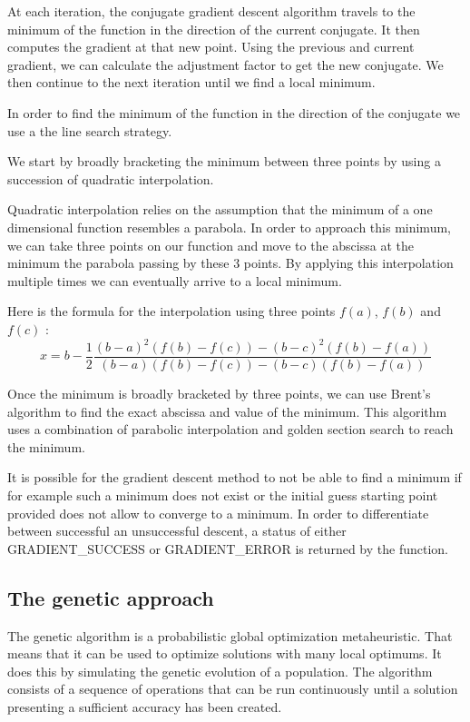\documentclass{book}
\begin{document}
At each iteration, the conjugate gradient descent algorithm travels to the minimum of the function in the direction of the current conjugate. It then computes the gradient at that new point. Using the previous and current gradient, we can calculate the adjustment factor to get the new conjugate. We then continue to the next iteration until we find a local minimum.

In order to find the minimum of the function in the direction of the conjugate we use a the line search strategy. 

We start by broadly bracketing the minimum between three points by using a succession of quadratic interpolation. 

Quadratic interpolation relies on the assumption that the minimum of a one dimensional function resembles a parabola. In order to approach this minimum, we can take three points on our function and move to the abscissa at the minimum the parabola passing by these 3 points. By applying this interpolation multiple times we can eventually arrive to a local minimum. 

Here is the formula for the interpolation using three points $f(a)$, $f(b)$ and $f(c)$ :
\begin{equation}
    x = b - \frac{1}{2} \frac{(b - a)^2(f(b) - f(c)) - (b - c)^2(f(b) - f(a))}{(b - a)(f(b) - f(c)) - (b - c)(f(b) - f(a))}
\end{equation}

Once the minimum is broadly bracketed by three points, we can use Brent's algorithm to find the exact abscissa and value of the minimum. This algorithm uses a combination of parabolic interpolation and golden section search to reach the minimum.

It is possible for the gradient descent method to not be able to find a minimum if for example such a minimum does not exist or the initial guess starting point provided does not allow to converge to a minimum. In order to differentiate between successful an unsuccessful descent, a status of either GRADIENT\_SUCCESS or GRADIENT\_ERROR is returned by the function.

\subsection{The genetic approach}

The genetic algorithm is a probabilistic global optimization metaheuristic. That means that it can be used to optimize solutions with many local optimums.
It does this by simulating the genetic evolution of a population. The algorithm consists of a sequence of operations that can be run continuously until a solution
presenting a sufficient accuracy has been created.
\end{document}
